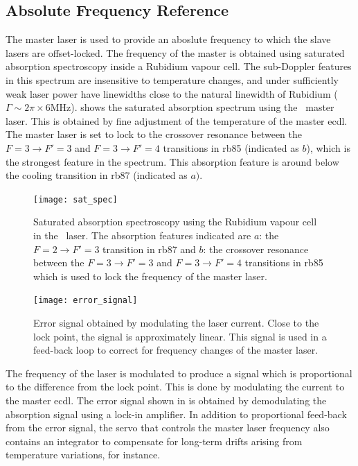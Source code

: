 \subsection{Absolute Frequency Reference}\label{subsec:muquans_master}
The master laser is used to provide an aboslute frequency to which the slave
lasers are offset-locked. The frequency of the master is obtained using
saturated absorption spectroscopy inside a Rubidium vapour cell. The sub-Doppler
features in this spectrum are insensitive to temperature changes, and under
sufficiently weak laser power have linewidths close to the natural linewidth of
Rubidium (\(\Gamma \sim 2\pi \times 6\)MHz). 
shows the saturated absorption spectrum using the \Muquans\ master laser. This
is obtained by fine adjustment of the temperature of the master \ac{ecdl}. The
master laser is set to lock to the crossover resonance between the \(F = 3
\rightarrow F' = 3\) and \(F = 3 \rightarrow F' =4 \) transitions in \ac{rb85}
(indicated as \(b\)), which is the strongest feature in the spectrum. This
absorption feature is around  below the cooling
transition in \ac{rb87} (indicated as \(a)\).
\begin{figure}
	\texttt{[image: sat\_spec]}
	\caption[Saturated absorption spectroscopy of the \\Muquans\ master laser.]{Saturated absorption spectroscopy using the Rubidium vapour cell in the \Muquans\ laser. The absorption features indicated are \(a\): the \(F = 2 \rightarrow F' = 3\) transition in \ac{rb87} and \(b\): the crossover resonance between the \(F = 3 \rightarrow F' = 3\) and \(F = 3 \rightarrow F' = 4 \) transitions in \ac{rb85} which is used to lock the frequency of the master laser.}\label{fig:muquans_satspec}
\end{figure}
\begin{figure}
	\texttt{[image: error\_signal]}
	\caption[Error Signal for the \Muquans\ master servo.]{Error signal obtained by modulating the laser current. Close to the lock point, the signal is approximately linear. This signal is used in a feed-back loop to correct for frequency changes of the master laser.}\label{fig:muquans_error_signal}
\end{figure}
The frequency of the laser is modulated to produce a signal which is
proportional to the difference from the lock point. This is done by modulating
the current to the master \ac{ecdl}. The error signal shown in
 is obtained by demodulating the absorption
signal using a lock-in amplifier. In addition to proportional feed-back from the
error signal, the servo that controls the master laser frequency also contains
an integrator to compensate for long-term drifts arising from temperature
variations, for instance.
